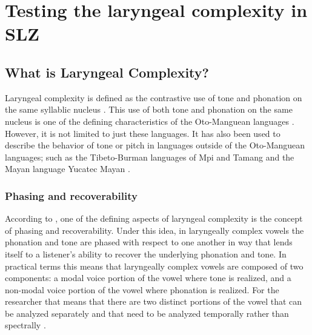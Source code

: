 \chapter{Testing the laryngeal complexity in SLZ} \label{ch:testing_lc}

\section{What is Laryngeal Complexity?}\label{sec:what_is_lc}

Laryngeal complexity is defined as the contrastive use of tone and phonation on the same syllablic nucleus \citep{silvermanLaryngealComplexityOtomanguean1997,silvermanPhasingRecoverability1997}. This use of both tone and phonation on the same nucleus is one of the defining characteristics of the Oto-Manguean languages \citep{silvermanLaryngealComplexityOtomanguean1997}. However, it is not limited to just these languages. It has also been used to describe the behavior of tone or pitch in languages outside of the Oto-Manguean languages; such as the Tibeto-Burman languages of Mpi and Tamang \citep{silvermanLaryngealComplexityOtomanguean1997,silvermanPhasingRecoverability1997} and the Mayan language Yucatec Mayan \citep{frazierPhoneticsYucatecMaya2013}. 


\subsection{Phasing and recoverability}\label{sec:phasing_and_recoverability}

According to \citet{silvermanLaryngealComplexityOtomanguean1997,silvermanPhasingRecoverability1997}, one of the defining aspects of laryngeal complexity is the concept of phasing and recoverability. Under this idea, in laryngeally complex vowels the phonation and tone are phased with respect to one another in way that lends itself to a listener's ability to recover the underlying phonation and tone. In practical terms this means that laryngeally complex vowels are composed of two components: a modal voice portion of the vowel where tone is realized, and a non-modal voice portion of the vowel where phonation is realized. For the researcher that means that there are two distinct portions of the vowel that can be analyzed separately and that need to be analyzed temporally rather than spectrally \citep[237]{silvermanLaryngealComplexityOtomanguean1997}.


